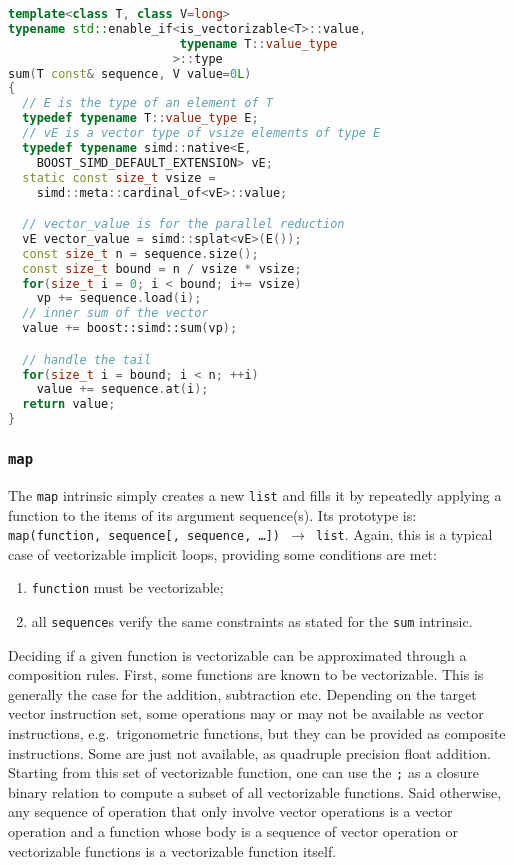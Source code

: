 \documentclass[preprint]{sigplanconf}
\begin{document}
\begin{lstlisting}[language=c++, label={lst:sum-cxx}, caption={Meta-implementation of the \texttt{sum} intrinsic in C++11.}]
template<class T, class V=long>
typename std::enable_if<is_vectorizable<T>::value,
                        typename T::value_type
                       >::type
sum(T const& sequence, V value=0L)
{
  // E is the type of an element of T
  typedef typename T::value_type E;
  // vE is a vector type of vsize elements of type E
  typedef typename simd::native<E,
    BOOST_SIMD_DEFAULT_EXTENSION> vE;
  static const size_t vsize =
    simd::meta::cardinal_of<vE>::value;

  // vector_value is for the parallel reduction
  vE vector_value = simd::splat<vE>(E());
  const size_t n = sequence.size();
  const size_t bound = n / vsize * vsize;
  for(size_t i = 0; i < bound; i+= vsize)
    vp += sequence.load(i);
  // inner sum of the vector
  value += boost::simd::sum(vp);

  // handle the tail
  for(size_t i = bound; i < n; ++i)
    value += sequence.at(i);
  return value;
}
\end{lstlisting}

\subsubsection{\texttt{map}}

The \texttt{map} intrinsic simply creates a new \texttt{list} and fills it by
repeatedly applying a function to the items of its argument sequence(s). Its
prototype is: \texttt{map(function, sequence[, sequence, \dots]) $\rightarrow$
list}. Again, this is a typical case of vectorizable implicit loops, providing
some conditions are met:

\begin{enumerate}

    \item[\label{enu:pure}] \texttt{function} must be vectorizable;
    \item[\label{enu:sequence}] all \texttt{sequence}s verify the same constraints as stated for the \texttt{sum} intrinsic.

\end{enumerate}

Deciding if a given function is vectorizable can be approximated through a
composition rules. First, some functions are known to be vectorizable. This is
generally the case for the addition, subtraction etc. Depending on the target
vector instruction set, some operations may or may not be available as vector
instructions, e.g.\ trigonometric functions, but they can be provided as
composite instructions. Some are just not available, as quadruple precision
float addition. Starting from this set of vectorizable function, one can use
the \texttt{;} as a closure binary relation to compute a subset of all
vectorizable functions. Said otherwise, any sequence of operation that only
involve vector operations is a vector operation and a function whose body is a
sequence of vector operation or vectorizable functions is a vectorizable
function itself.
\end{document}
